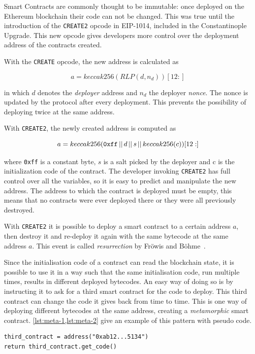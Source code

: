 Smart Contracts are commonly thought to be immutable: once deployed on the Ethereum blockchain their code can not be changed. This was true until the introduction of the {\tt CREATE2} opcode in EIP-1014, included in the Constantinople Upgrade. This new opcode gives developers more control over the deployment address of the contracts created. 

With the {\tt CREATE} opcode, the new address is calculated as

\[a=keccak256(RLP(d,n_d))[12:] \]

in which $d$ denotes the \textit{deployer} address and $n_d$ the deployer \textit{nonce}. The nonce is updated by the protocol after every deployment. This prevents the possibility of deploying twice at the same address.

With {\tt CREATE2}, the newly created address is computed as

\[a=keccak256({\tt 0xff}\,||\,d\,||\,s\,||\,keccak256(c))[12:]\]

where {\tt 0xff} is a constant byte, $s$ is a salt picked by the deployer and c is the initialization code of the contract. The developer invoking {\tt CREATE2} has full control over all the variables, so it is easy to predict and manipulate the new address. The address to which the contract is deployed must be empty, this means that no contracts were ever deployed there or they were all previously destroyed.

With {\tt CREATE2} it is possible to deploy a smart contract to a certain address $a$, then destroy it and re-deploy it again with the same bytecode at the same address $a$. This event is called \textit{resurrection} by Fröwis and Böhme~\cite{create2-metamorphic}. 

Since the initialisation code of a contract can read the blockchain state, it is possible to use it in a way such that the same initialisation code, run multiple times, results in different deployed bytecodes. An easy way of doing so is by instructing it to ask for a third smart contract for the code to deploy. This third contract can change the code it gives back from time to time. This is one way of deploying different bytecodes at the same address, creating a \textit{metamorphic} smart contract. \cref{lst:meta-1,lst:meta-2} give an example of this pattern with pseudo code.

\begin{lstlisting}[label={lst:meta-1},caption={Pseudo initialization code that gets the code to deploy from another contract.}]
third_contract = address("0xab12...5134")
return third_contract.get_code()
\end{lstlisting}

